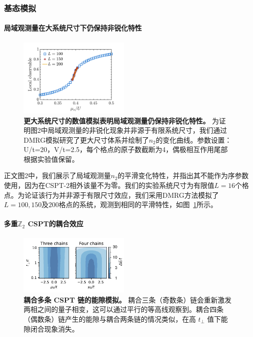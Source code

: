 \documentclass[preprint,superscriptaddress,floatfix, nofootinbib]{revtex4-2}
\begin{document}
\begin{CJK*}{UTF8}{gbsn}
\subsubsection*{基态模拟}

\paragraph*{局域观测量在大系统尺寸下仍保持非锐化特性}

\begin{figure}
    \centering
    \includegraphics[width=0.48\textwidth]{figures/large_size_local_observable.pdf}
    \caption{\textbf{更大系统尺寸的数值模拟表明局域观测量仍保持非锐化特性。} 为证明图2中局域观测量的非锐化现象并非源于有限系统尺寸，我们通过DMRG模拟研究了更大尺寸体系并绘制了$n_2$的变化曲线。参数设置：U/t=20，V/t=2.5，每个格点的原子数截断为4，偶极相互作用尾部根据实验值保留。}
    \label{fig: large_size_local_observable}
\end{figure}

正文图2中，我们展示了局域观测量$n_2$的平滑变化特性，并指出其不能作为序参数使用，因为在CSPT-2相外该量不为零。我们的实验系统尺寸为有限值$L=16$个格点。为论证该行为并非源于有限尺寸效应，我们采用DMRG方法模拟了$L=100, 150$及$200$格点的系统，观测到相同的平滑特性，如图~\ref{fig: large_size_local_observable}所示。

\paragraph*{多重$\mathbb{Z}_2$ CSPT的耦合效应}

\begin{figure}
    \centering
    \includegraphics[width=0.48\textwidth]{figures/three_or_more_coupled_chains.pdf}
    \caption{\textbf{耦合多条 CSPT 链的能隙模拟。} 耦合三条（奇数条）链会重新激发两相之间的量子相变，这可以通过平行的等高线观察到。耦合四条（偶数条）链产生的能隙与耦合两条链的情况类似，在高 $t_\perp$ 值下能隙闭合现象消失。
    }
    \label{fig: three_or_more_coupled_chains}
\end{figure}


\end{CJK*}
\end{document}
